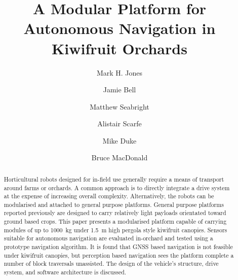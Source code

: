 \documentclass[preprint,authoryear,12pt]{elsarticle}
\begin{document}
\begin{frontmatter}



\title{A Modular Platform for Autonomous Navigation in Kiwifruit Orchards}



\author[UoW]{Mark H. Jones}

\author[UoA]{Jamie Bell}
\author[UoW]{Matthew Seabright}
\author[RPL]{Alistair Scarfe}
\author[UoW]{Mike Duke}
\author[UoA]{Bruce MacDonald}

\address[UoW]{School of Engineering, University of Waikato, Hamilton, New Zealand}
\address[UoA]{Faculty of Engineering, University of Auckland, Auckland, New Zealand}
\address[RPL]{Robotics Plus Ltd, Newnham Innovation Park, Tauranga, New Zealand}


\begin{abstract}
    Horticultural robots designed for in-field use generally require a means of transport around farms or orchards.
    A common approach is to directly integrate a drive system at the expense of increasing overall complexity.
    Alternatively, the robots can be modularised and attached to general purpose platforms.
    General purpose platforms reported previously are designed to carry relatively light payloads orientated toward ground based crops.
    This paper presents a modularised platform capable of carrying modules of up to \SI{1000}{\kilo\gram} under \SI{1.5}{\meter} high pergola style kiwifruit canopies.
    Sensors suitable for autonomous navigation are evaluated in-orchard and tested using a prototype navigation algorithm.
    It is found that GNSS based navigation is not feasible under kiwifruit canopies, but perception based navigation sees the platform complete a number of block traversals unassisted.
    The design of the vehicle's structure, drive system, and software architecture is discussed.


\end{abstract}
\end{frontmatter}
\end{document}
